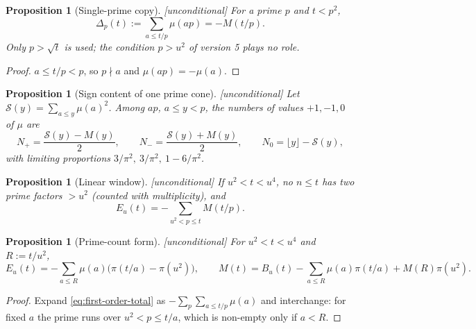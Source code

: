 \documentclass[11pt]{amsart}
\numberwithin{equation}{section}
\theoremstyle{plain}
\newtheorem{proposition}[theorem]{Proposition}
\theoremstyle{definition}
\theoremstyle{remark}
\newcommand{\Sq}{\mathcal{S}}
\begin{document}
\begin{proposition}[Single-prime copy]
\label{prop:single_prime_copy}
\emph{[unconditional]} For a prime $p$ and $t<p^2$,
\begin{equation}
\label{eq:single-prime-copy}
  \Delta_p(t):=\sum_{a\le t/p}\mu(ap)=-M(t/p).
\end{equation}
Only $p>\sqrt t$ is used; the condition $p>u^2$ of version 5 plays no role.
\end{proposition}

\begin{proof}
$a\le t/p<p$, so $p\nmid a$ and $\mu(ap)=-\mu(a)$.
\end{proof}

\begin{proposition}[Sign content of one prime cone]
\label{prop:prime-cone-signs}
\emph{[unconditional]} Let $\Sq(y)=\sum_{a\le y}\mu(a)^2$. Among $ap$,
$a\le y<p$, the numbers of values $+1,-1,0$ of $\mu$ are
\begin{equation}
\label{eq:cone_counts}
  N_+=\frac{\Sq(y)-M(y)}{2},\qquad N_-=\frac{\Sq(y)+M(y)}{2},\qquad
  N_0=\lfloor y\rfloor-\Sq(y),
\end{equation}
with limiting proportions $3/\pi^2,\ 3/\pi^2,\ 1-6/\pi^2$.
\end{proposition}

\begin{proposition}[Linear window]
\label{prop:linear-new-primes}
\emph{[unconditional]} If $u^2<t<u^4$, no $n\le t$ has two prime factors
$>u^2$ (counted with multiplicity), and
\begin{equation}
\label{eq:first-order-total}
  E_u(t)=-\sum_{u^2<p\le t}M(t/p).
\end{equation}
\end{proposition}

\begin{proposition}[Prime-count form]
\label{prop:prime_count_form}
\emph{[unconditional]} For $u^2<t<u^4$ and $R:=t/u^2$,
\begin{equation}
\label{eq:prime_count_form}
  E_u(t)=-\sum_{a\le R}\mu(a)\bigl(\pi(t/a)-\pi(u^2)\bigr),
  \qquad
  M(t)=B_u(t)-\sum_{a\le R}\mu(a)\pi(t/a)+M(R)\pi(u^2).
\end{equation}
\end{proposition}

\begin{proof}
Expand \eqref{eq:first-order-total} as
$-\sum_{p}\sum_{a\le t/p}\mu(a)$ and interchange: for fixed $a$ the prime
runs over $u^2<p\le t/a$, which is non-empty only if $a<R$.
\end{proof}
\end{document}
